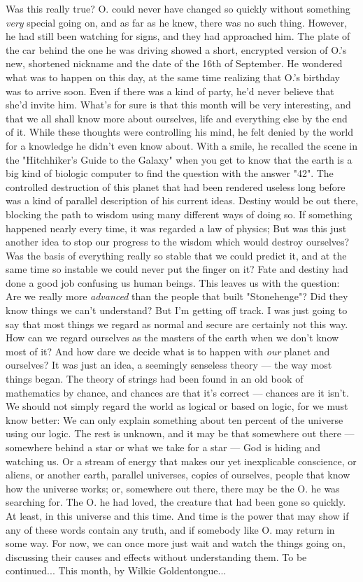 Was this really true? O. could never have changed so quickly without something \emph{very} special going on, and as far as he knew, there was no such thing. However, he had still been watching for signs, and they had approached him. The plate of the car behind the one he was driving showed a short, encrypted version of O.'s new, shortened nickname and the date of the 16th of September. He wondered what was to happen on this day, at the same time realizing that O.'s birthday was to arrive soon. Even if there was a kind of party, he'd never believe that she'd invite him. 
What's for sure is that this month will be very interesting, and that we all shall know more about ourselves, life and everything else by the end of it. While these thoughts were controlling his mind, he felt denied by the world for a knowledge he didn't even know about. With a smile, he recalled the scene in the "Hitchhiker's Guide to the Galaxy" when you get to know that the earth is a big kind of biologic computer to find the question with the answer "42". The controlled destruction of this planet that had been rendered useless long before was a kind of parallel description of his current ideas. Destiny would be out there, blocking the path to wisdom using many different ways of doing so. If something happened nearly every time, it was regarded a law of physics; But was this just another idea to stop our progress to the wisdom which would destroy ourselves? Was the basis of everything really so stable that we could predict it, and at the same time so instable we could never put the finger on it? Fate and destiny had done a good job confusing us human beings. 
This leaves us with the question: Are we really more \emph{advanced} than the people that built "Stonehenge"? Did they know things we can't understand? 
But I'm getting off track. I was just going to say that most things we regard as normal and secure are certainly not this way. How can we regard ourselves as the masters of the earth when we don't know most of it? And how dare we decide what is to happen with \emph{our} planet and ourselves? 
It was just an idea, a seemingly senseless theory --- the way most things began. The theory of strings had been found in an old book of mathematics by chance, and chances are that it's correct --- chances are it isn't. 
We should not simply regard the world as logical or based on logic, for we must know better: We can only explain something about ten percent of the universe using our logic. The rest is unknown, and it may be that somewhere out there --- somewhere behind a star or what we take for a star --- God is hiding and watching us. Or a stream of energy that makes our yet inexplicable conscience, or aliens, or another earth, parallel universes, copies of ourselves, people that know how the universe works; or, somewhere out there, there may be the O. he was searching for. The O. he had loved, the creature that had been gone so quickly. 
At least, in this universe and this time. 
And time is the power that may show if any of these words contain any truth, and if somebody like O. may return in some way. 
For now, we can once more just wait and watch the things going on, discussing their causes and effects without understanding them. 
To be continued...
This month, by Wilkie Goldentongue...

